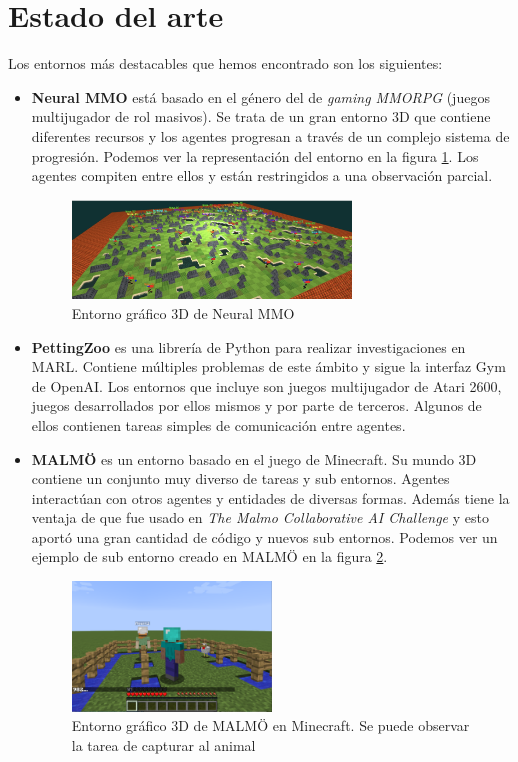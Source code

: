 \section{Estado del arte}

Los entornos más destacables que hemos encontrado son los siguientes:
\begin{itemize}
    \item \textbf{Neural MMO} está basado en el género del de \emph{gaming MMORPG} (juegos multijugador de rol masivos). Se trata de un gran entorno 3D que contiene diferentes recursos  y los agentes progresan a través de un complejo sistema de progresión. Podemos ver la representación del entorno en la figura \ref {fig:neural-mmo}. Los agentes compiten entre ellos y están restringidos a una observación parcial. \cite {env-list} 
        \begin{figure}[ht]
            \centering
            \includegraphics[width=0.7\textwidth]{img/neural-mmo.png}
            \caption{Entorno gráfico 3D de Neural MMO \cite{neural-mmo}}
            \label{fig:neural-mmo}
        \end{figure}
    \item \textbf{PettingZoo} es una librería de Python para realizar investigaciones en MARL. Contiene múltiples problemas de este ámbito y sigue la interfaz Gym de OpenAI. Los entornos que incluye son juegos multijugador de Atari 2600, juegos desarrollados por ellos mismos y por parte de terceros. Algunos de ellos contienen tareas simples de comunicación entre agentes.\cite {env-list}
    \item \textbf{MALMÖ} es un entorno basado en el juego de Minecraft. Su mundo 3D contiene un conjunto muy diverso de tareas y sub entornos. Agentes interactúan con otros agentes y entidades de diversas formas. Además tiene la ventaja de que fue usado en \emph{The Malmo Collaborative AI Challenge} y esto aportó una gran cantidad de código y nuevos sub entornos. \cite {env-list} Podemos ver un ejemplo de sub entorno creado en MALMÖ en la figura \ref {fig:mob-chase}.
        \begin{figure}[ht]
            \centering
            \includegraphics[width=0.5\textwidth]{img/mobchase.png}
            \caption{Entorno gráfico 3D de MALMÖ en Minecraft. Se puede observar la tarea de capturar al animal \cite {malmo}}
            \label{fig:mob-chase}
        \end{figure}
        

\end{itemize}
